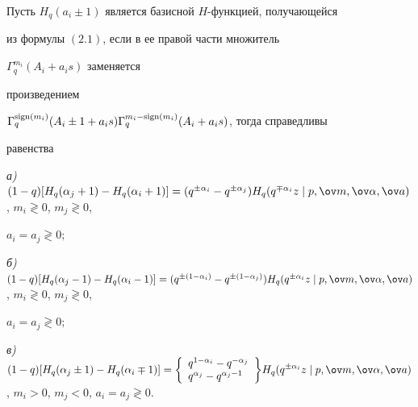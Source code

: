  


\begin{thms} 


Пусть $H_q(a_i\pm1)$ является базисной $H$-функцией, получающейся 


из формулы $(2.1)$, если в ее правой части множитель 


$\Gamma^{m_i}_q(A_i+a_i s)$ заменяется 


произведением 


$\Gamma^{\sign(m_i)}_q(A_i\pm1+a_i s)\Gamma^{m_i-\sign(m_i)}_q(A_i+a_i 


s)$, тогда справедливы 


равенства 


 


{\em а)} $(1-q)[H_q(\alpha_j+1)-H_q(\alpha_i+1)]= 


(q^{\pm\alpha_i}-q^{\pm\alpha_j}) H_q(q^{\mp\alpha_i}z\mid 


p,\ov m,\ov\alpha,\ov a)$, $m_i\gtrless0$, $m_j\gtrless0$, 


$a_i=a_j\gtrless0;$ 


 


{\em б)} $(1-q)[H_q(\alpha_j-1)-H_q(\alpha_i-1)]= 


(q^{\pm(1-\alpha_i)}-q^{\pm(1-\alpha_j)})H_q(q^{\pm\alpha_i}z 


\mid p,\ov m,\ov\alpha,\ov a)$, $m_i\gtrless0$, $m_j\gtrless0$, 


$a_i=a_j\gtrless0;$ 


 


{\em в)} $(1-q)[H_q(\alpha_j\pm1)-H_q(\alpha_i\mp1)]= 


\displaystyle{


\left\{


\begin{array}{l} q^{1-\alpha_i}-q^{-\alpha_j}\\ 


q^{\alpha_j}-q^{\alpha_j-1}


\end{array}


\right\}


}


H_q(q^{\pm\alpha_i}z\mid 


p,\ov m,\ov\alpha,\ov a)$, $m_i>0$, $m_j<0$, $a_i=a_j\gtrless0$. 


\end{thms} 


